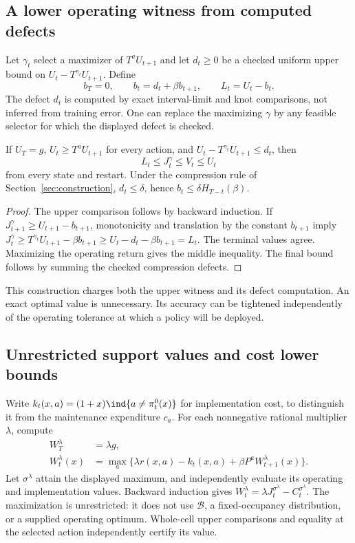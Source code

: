 \subsection{A lower operating witness from computed defects}
Let $\gamma_t$ select a maximizer of $T^aU_{t+1}$ and let $d_t\ge0$ be a checked uniform upper bound on $U_t-T^{\gamma_t}U_{t+1}$. Define
\begin{equation}\label{eq:lowerconstruct}
 b_T=0,\qquad b_t=d_t+\beta b_{t+1},\qquad L_t=U_t-b_t.
\end{equation}
The defect $d_t$ is computed by exact interval-limit and knot comparisons, not inferred from training error. One can replace the maximizing $\gamma$ by any feasible selector for which the displayed defect is checked.
\begin{lemma}\label{lem:lower}
If $U_T=g$, $U_t\ge T^aU_{t+1}$ for every action, and $U_t-T^{\gamma_t}U_{t+1}\le d_t$, then
\begin{equation}\label{eq:two-sided}
 L_t\le J_t^\gamma\le V_t\le U_t
\end{equation}
from every state and restart. Under the compression rule of Section~\ref{sec:construction}, $d_t\le\delta$, hence $b_t\le\delta H_{T-t}(\beta)$.
\end{lemma}
\begin{proof}
The upper comparison follows by backward induction. If $J_{t+1}^\gamma\ge U_{t+1}-b_{t+1}$, monotonicity and translation by the constant $b_{t+1}$ imply
$J_t^\gamma\ge T^{\gamma_t}U_{t+1}-\beta b_{t+1}\ge U_t-d_t-\beta b_{t+1}=L_t$.
The terminal values agree. Maximizing the operating return gives the middle inequality. The final bound follows by summing the checked compression defects.\end{proof}
This construction charges both the upper witness and its defect computation. An exact optimal value is unnecessary. Its accuracy can be tightened independently of the operating tolerance at which a policy will be deployed.

\subsection{Unrestricted support values and cost lower bounds}
Write $k_t(x,a)=(1+x)\ind\{a\ne\pi_t^0(x)\}$ for implementation cost, to distinguish it from the maintenance expenditure $c_a$. For each nonnegative rational multiplier $\lambda$, compute
\begin{equation}\label{eq:support}
\begin{split}
 W_T^\lambda&=\lambda g,\\
 W_t^\lambda(x)&=\max_a\{\lambda r(x,a)-k_t(x,a)
                 +\beta P^aW_{t+1}^\lambda(x)\}.
\end{split}
\end{equation}
Let $\sigma^\lambda$ attain the displayed maximum, and independently evaluate its operating and implementation values. Backward induction gives
$W_t^\lambda=\lambda J_t^{\sigma^\lambda}-C_t^{\sigma^\lambda}$.
The maximization is unrestricted: it does not use $\mathcal B$, a fixed-occupancy distribution, or a supplied operating optimum. Whole-cell upper comparisons and equality at the selected action independently certify its value.

